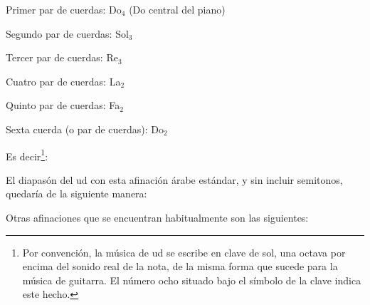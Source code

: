 \begin{compactitem}
    \item Primer par de cuerdas: Do$_4$ (Do central del piano)
    \item Segundo par de cuerdas: Sol$_3$
    \item Tercer par de cuerdas: Re$_3$
    \item Cuatro par de cuerdas: La$_2$
    \item Quinto par de cuerdas: Fa$_2$
    \item Sexta cuerda (o par de cuerdas): Do$_2$
\end{compactitem}

Es decir\footnote{Por convención, la música de ud se escribe en clave de sol, una octava por encima del sonido real de la nota, de la misma forma que sucede para la música de guitarra. El número ocho situado bajo el símbolo de la clave indica este hecho.}:

\begin{center}
\end{center}

El diapasón del ud con esta afinación árabe estándar, y sin incluir semitonos, quedaría de la siguiente manera:



Otras afinaciones que se encuentran habitualmente son las siguientes:

\begin{center}
\end{center}

